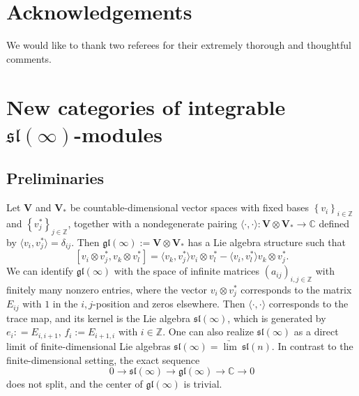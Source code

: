 \documentclass[12pt,oneside,english]{amsart}
\numberwithin{equation}{section}
\numberwithin{figure}{section}
\theoremstyle{plain}
\theoremstyle{plain}
\theoremstyle{remark}
\theoremstyle{definition}
\theoremstyle{plain}
\theoremstyle{remark}
\theoremstyle{definition}
\theoremstyle{plain}
\theoremstyle{plain}
\theoremstyle{definition}
\newcommand{\bV}{\mathbf{V}}
\begin{document}

\section{Acknowledgements}

We would like to thank two referees for their extremely thorough and thoughtful comments.









\section{New categories of integrable $\mathfrak{sl}(\infty)$-modules}\label{sl inf}

\subsection{Preliminaries}\label{prelims}

Let $\bV$ and $\bV_{*}$ be countable-dimensional vector spaces with fixed bases  $\left\{ v_{i}\right\} _{i\in\mathbb{Z}}$ and  $\left\{ v_{j}^{*}\right\} _{j\in\mathbb{Z}}$, together with a nondegenerate
pairing $\langle\cdot,\cdot\rangle:\bV\otimes \bV_{*}\rightarrow\mathbb{C}$ defined by $\langle v_i,v_j^*\rangle=\delta_{ij}$. Then $\mathfrak{gl}\left(\infty\right):=\bV\otimes \bV_{*}$
has a Lie algebra structure such that
\[
[v_{i}\otimes v_{j}^*,v_{k}\otimes v_{l}^*]=\langle v_{k},v_{j}^*\rangle v_{i}\otimes v_{l}^*-\langle v_{i}, v_{l}^*\rangle v_{k}\otimes v_{j}^*.
\]
We can identify $\mathfrak{gl}(\infty)$ with the
space of infinite matrices $\left(a_{ij}\right)_{i,j\in\mathbb{Z}}$
with finitely many nonzero entries, where the vector $v_{i}\otimes v_{j}^{*}$
corresponds to the matrix $E_{ij}$ with $1$ in the $i,j$-position and zeros elsewhere.
Then $\langle\cdot,\cdot\rangle$ corresponds to the trace map, and its kernel is the Lie algebra  $\mathfrak{sl}\left(\infty\right)$, which is generated by $e_i: = E_{i, i+1}$, $f_i:=E_{i+1,i}$ with $i\in\mathbb{Z}$. One can also
realize $\mathfrak{sl}(\infty)$ as a direct limit of finite-dimensional Lie algebras $\mathfrak{sl}(\infty)=\underrightarrow{\lim}\ \mathfrak{sl}\left(n\right)$.
In contrast to the finite-dimensional setting, the exact sequence
\[
0\to\mathfrak{sl}(\infty)\to\mathfrak{gl}(\infty)\to\mathbb{C}\to0
\]
does not split, and the center of $\mathfrak{gl}(\infty)$ is trivial.
\end{document}
